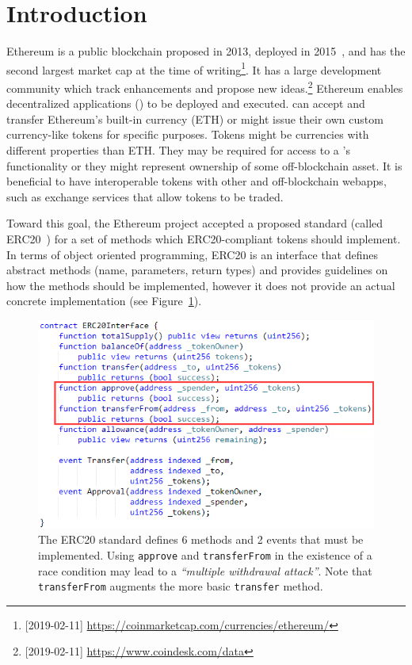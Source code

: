 
\section{Introduction}


Ethereum is a public blockchain proposed in 2013, deployed in 2015~\cite{Ref00}, and has the second largest market cap at the time of writing\footnote{[2019-02-11] \url{https://coinmarketcap.com/currencies/ethereum/}}. It has a large development community which track enhancements and propose new ideas.\footnote{[2019-02-11] \url{https://www.coindesk.com/data}} Ethereum enables decentralized applications (\dapps) to be deployed and executed. \dapps can accept and transfer Ethereum's built-in currency (ETH) or might issue their own custom currency-like tokens for specific purposes. Tokens might be currencies with different properties than ETH. They may be required for access to a \dapp's functionality or they might represent ownership of some off-blockchain asset. It is beneficial to have interoperable tokens with other \dapps and off-blockchain webapps, such as exchange services that allow tokens to be traded.

Toward this goal, the Ethereum project accepted a proposed standard (called ERC20~\cite{Ref08}) for a set of methods which ERC20-compliant tokens should implement. In terms of object oriented programming, ERC20 is an interface that defines abstract methods (name, parameters, return types) and provides guidelines on how the methods should be implemented, however it does not provide an actual concrete implementation (see Figure~\ref{fig:erc20api}). 

\begin{figure}[t!]
	\centering
	\includegraphics[width=1.0\linewidth]{figures/multiple_withdrawal_01.png}
	\caption{The ERC20 standard defines 6 methods and 2 events that must be implemented. Using \texttt{approve} and \texttt{transferFrom} in the existence of a race condition may lead to a \textit{``multiple withdrawal attack''}. Note that \texttt{transferFrom} augments the more basic \texttt{transfer} method.}\label{fig:erc20api}
\end{figure}


